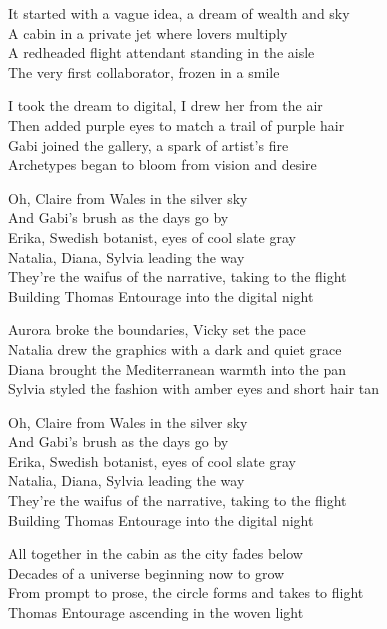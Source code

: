 \begin{lyrics}
It started with a vague idea, a dream of wealth and sky\\
A cabin in a private jet where lovers multiply\\
A redheaded flight attendant standing in the aisle\\
The very first collaborator, frozen in a smile

I took the dream to digital, I drew her from the air\\
Then added purple eyes to match a trail of purple hair\\
Gabi joined the gallery, a spark of artist's fire\\
Archetypes began to bloom from vision and desire

Oh, Claire from Wales in the silver sky\\
And Gabi's brush as the days go by\\
Erika, Swedish botanist, eyes of cool slate gray\\
Natalia, Diana, Sylvia leading the way\\
They're the waifus of the narrative, taking to the flight\\
Building Thomas Entourage into the digital night

Aurora broke the boundaries, Vicky set the pace\\
Natalia drew the graphics with a dark and quiet grace\\
Diana brought the Mediterranean warmth into the pan\\
Sylvia styled the fashion with amber eyes and short hair tan

Oh, Claire from Wales in the silver sky\\
And Gabi's brush as the days go by\\
Erika, Swedish botanist, eyes of cool slate gray\\
Natalia, Diana, Sylvia leading the way\\
They're the waifus of the narrative, taking to the flight\\
Building Thomas Entourage into the digital night

All together in the cabin as the city fades below\\
Decades of a universe beginning now to grow\\
From prompt to prose, the circle forms and takes to flight\\
Thomas Entourage ascending in the woven light
\end{lyrics}

